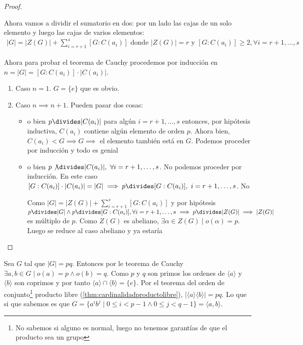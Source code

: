 \begin{proof}
\begin{itemize}
		Ahora vamos a dividir el sumatorio en dos: por un lado las cajas de un solo elemento y luego las cajas de varios elementos:
		\begin{align}
		\label{eq:thmcauchy}
		|G| = |Z(G)| + \sum_{i = r + 1}^{s} [G : C(a_i)] \text{ donde } |Z(G)| = r \text{ y } [G : C(a_i)] \geq 2, \forall i = r+1,\dots, s
		\end{align}
		
		Ahora para probar el teorema de Cauchy procedemos por inducción en $n = |G| = [G:C(a_i)]\cdot |C(a_i)|$.
		
		\begin{enumerate}
			\item Caso $n = 1$. $G = \{e\}$ que es obvio.
			\item Caso $n \implies n+1$. Pueden pasar dos cosas:
			\begin{itemize}
				\item o bien $p \divides |C(a_i)|$ para algún $i = r+1, \dots, s$ entonces, por hipótesis inductiva, $C(a_i)$ contiene algún elemento de orden $p$. Ahora bien, $C(a_i) < G \implies G \implies $ el elemento también está en $G$. Podemos proceder por inducción y todo es genial \qedsymbol
				
				\item o bien $p \not\divides |C(a_i)|,\ \forall i = r+1,\dots,s$. No podemos proceder por inducción. En este caso $[G:C(a_i)]\cdot |C(a_i)| = |G| \implies p \divides [G: C(a_i)],\ i = r+1,\dots, s$. No
				
				Como $|G| = |Z(G)| + \sum_{i = r + 1}^{s} [G : C(a_i)]$ y por hipótesis $p \divides |G| \land p \divides [G : C(a_i)], \forall i = r+1,\dots,s \implies p \divides |Z(G)| \implies |Z(G)|$ es múltiplo de $p$. Como $Z(G)$ es abeliano, $\exists \alpha \in Z(G) \mid o(\alpha) = p$. Luego se reduce al caso abeliano y ya estaría \qedhere
			\end{itemize}
		\end{enumerate}
	\end{itemize}
\end{proof}

\begin{ej}
	Sea $G$ tal que $|G| = pq$. Entonces por le teorema de Cauchy $\exists a,b \in G \mid o(a) = p \land o(b) = q$. Como $p$ y $q$ son primos los ordenes de $\langle a \rangle$ y $\langle b \rangle$ son coprimos y por tanto $\langle a \rangle \cap \langle b \rangle = \{e\}$. Por el teorema del orden de conjunto\footnote{No sabemos si alguno es normal, luego no tenemos garantías de que el producto sea un grupo} producto libre (\ref{thm:cardinalidadproductolibre}), $|\langle a \rangle \langle b \rangle| = pq$. Lo que si que sabemos es que $G = \{a^ib^j \mid 0 \leq i < p -1 \land 0 \leq j < q - 1\} = \langle a, b \rangle$.
\end{ej}

